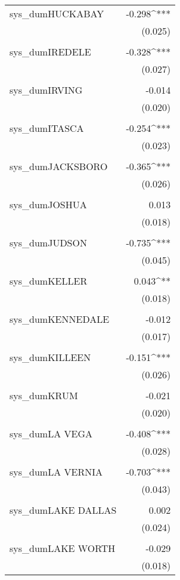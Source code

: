\begin{table}[!htbp]
\begin{tabular}{@{\extracolsep{5pt}}lD{.}{.}{-3} }
 sys\_dumHUCKABAY & -0.298^{***} \\ 
  & (0.025) \\ 
  & \\ 
 sys\_dumIREDELE & -0.328^{***} \\ 
  & (0.027) \\ 
  & \\ 
 sys\_dumIRVING & -0.014 \\ 
  & (0.020) \\ 
  & \\ 
 sys\_dumITASCA & -0.254^{***} \\ 
  & (0.023) \\ 
  & \\ 
 sys\_dumJACKSBORO & -0.365^{***} \\ 
  & (0.026) \\ 
  & \\ 
 sys\_dumJOSHUA & 0.013 \\ 
  & (0.018) \\ 
  & \\ 
 sys\_dumJUDSON & -0.735^{***} \\ 
  & (0.045) \\ 
  & \\ 
 sys\_dumKELLER & 0.043^{**} \\ 
  & (0.018) \\ 
  & \\ 
 sys\_dumKENNEDALE & -0.012 \\ 
  & (0.017) \\ 
  & \\ 
 sys\_dumKILLEEN & -0.151^{***} \\ 
  & (0.026) \\ 
  & \\ 
 sys\_dumKRUM & -0.021 \\ 
  & (0.020) \\ 
  & \\ 
 sys\_dumLA VEGA & -0.408^{***} \\ 
  & (0.028) \\ 
  & \\ 
 sys\_dumLA VERNIA & -0.703^{***} \\ 
  & (0.043) \\ 
  & \\ 
 sys\_dumLAKE DALLAS & 0.002 \\ 
  & (0.024) \\ 
  & \\ 
 sys\_dumLAKE WORTH & -0.029 \\ 
  & (0.018) \\ 

\end{tabular}
\end{table}
